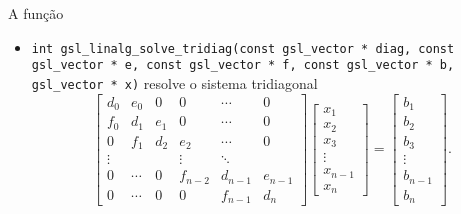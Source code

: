 A função
\begin{itemize}
 \item \verb|int gsl_linalg_solve_tridiag(const gsl_vector * diag, const gsl_vector * e, const gsl_vector * f, const gsl_vector * b, gsl_vector * x)| resolve o sistema tridiagonal
$$
\left[\begin{array}{cccccc}
d_0&e_0 & 0 &0&\cdots &0\\
f_0&d_1&e_1 & 0 &\cdots &0\\
0&f_1&d_2 & e_2 &\cdots &0\\
\vdots && & \vdots &\ddots& \\
0&\cdots&0 & f_{n-2} &d_{n-1} &e_{n-1}\\
0&\cdots&0 & 0 &f_{n-1} &d_n
\end{array}\right]\left[\begin{array}{c}x_1\\x_2\\x_3\\ \vdots \\x_{n-1}\\x_n\end{array}\right]=
\left[\begin{array}{c}b_1\\b_2\\b_3\\ \vdots \\ b_{n-1}\\b_n\end{array}\right].
$$
\end{itemize}

